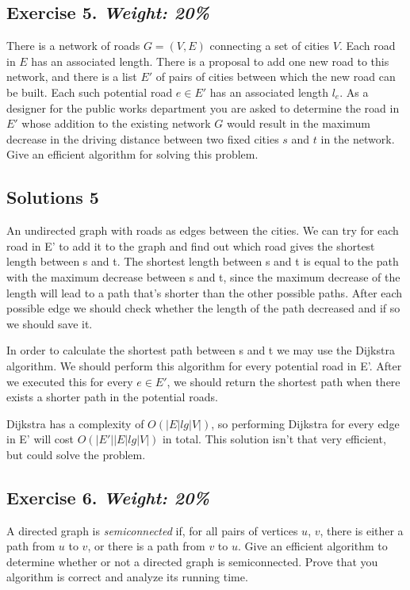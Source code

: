 \documentclass{article}
\begin{document}
\newpage
\subsection*{Exercise 5. \textit{Weight: 20\%}}
There is a network of roads $G = (V, E)$ connecting a set of cities $V$.
Each road in $E$ has an associated length.
There is a proposal to add one new road to this network, and there is a list $E'$ of pairs of cities between which the new
road can be built.
Each such potential road $e \in E'$ has an associated length $l_e$.
As a designer for the public works department you are asked to determine the road in $E'$ whose addition to the existing network $G$
would result in the maximum decrease in the driving distance between two fixed cities $s$ and $t$ in the network.
Give an efficient algorithm for solving this problem.

\subsection*{Solutions 5}
 An undirected graph with roads as edges between the cities. We can try for each road in E' to add it to the graph and find out which road gives the shortest length between s and t. The shortest length between s and t is equal to the path with the maximum decrease between s and t, since the maximum decrease of the length will lead to a path that's shorter than the other possible paths. After each possible edge we should check whether the length of the path decreased and if so we should save it.

 In order to calculate the shortest path between s and t we may use the Dijkstra algorithm. We should perform this algorithm for every potential road in E'. After we executed this for every $e \in E'$, we should return the shortest path when there exists a shorter path in the potential roads.

 Dijkstra has a complexity of $O(|E|lg|V|)$, so performing Dijkstra for every edge in E' will cost $O(|E'||E|lg|V|)$ in total. This solution isn't that very efficient, but could solve the problem.

\newpage
\subsection*{Exercise 6. \textit{Weight: 20\%}}
A directed graph is \emph{semiconnected} if, for all pairs of vertices $u$, $v$, there is either a path from $u$ to $v$,
or there is a path from $v$ to $u$.
Give an efficient algorithm to determine whether or not a directed graph is semiconnected.
Prove that you algorithm is correct and analyze its running time.
\end{document}
